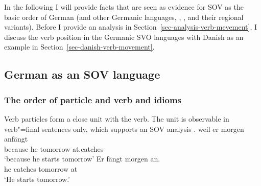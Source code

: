 
In the following I will provide facts that are seen as evidence for SOV as the basic order of German
(and other Germanic languages, \eg {}, ,  and their regional
variants). Before I provide an analysis in Section~\ref{sec-analysis-verb-mevement}, I discuss the 
verb position in the Germanic SVO languages with Danish as an example in Section~\ref{sec-danish-verb-movement}.

\subsection{German as an SOV language}
\label{sec-German-as-SOV}

\subsubsection{The order of particle and verb and idioms}

Verb particles form a close unit with the verb. The unit is observable in verb"=final sentences only,
which supports an SOV analysis \citep[]{Bierwisch63a}. 
\eal
\ex 
\gll weil er morgen anfängt\\
     because he tomorrow at.catches\\
\glt `because he starts tomorrow'
\ex 
\gll Er fängt morgen an.\\
     he catches tomorrow at\\
\glt `He starts tomorrow.'
\zl

